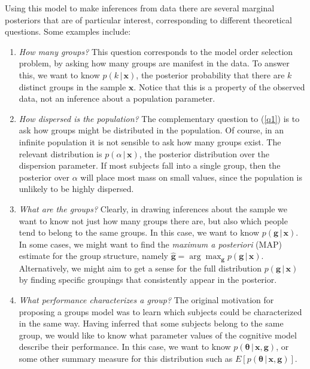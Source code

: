 \documentclass[authoryear]{elsarticle}
\newcommand{\condon}{\,|\,}
\newcommand{\vctr}[1]{\bm{#1}}
\begin{document}
Using this model to make inferences from data there are several
marginal posteriors that are of particular interest, corresponding to different
theoretical questions. Some examples include:
\begin{enumerate}
\item \label{q1} {\it How many groups?} This question corresponds to the model order
selection problem, by asking how many groups are manifest in the data. To answer this,
we want to know $p(k\condon \vctr{x})$, the
posterior probability that there are $k$ distinct groups in the
sample $\vctr{x}$. Notice that this is a property of the observed data, not an
inference about a population parameter. \vspace*{5pt}
\item {\it How dispersed is the population?} The complementary question to
(\ref{q1}) is to ask how groups might be distributed in the
population. Of course, in an infinite population it is not sensible to ask
how many groups exist.  The relevant distribution is $p(\alpha \condon \vctr{x})$,
the posterior distribution over the dispersion parameter. If most subjects
fall into a single group, then the posterior over $\alpha$ will place most mass
on small values, since the population is unlikely to be highly dispersed. \vspace*{5pt}
\item {\it What are the groups?} Clearly, in drawing inferences about the
sample we want to know not just how many groups there are, but also which people tend
to belong to the same groups. In this case, we want to know $p(\vctr{g} \condon \vctr{x})$.
In some cases, we might want to find the {\it maximum a posteriori} (MAP)
estimate for the group structure, namely $\hat{\vctr{g}} = \arg \max_{\vctr{g}}
p(\vctr{g} \condon \vctr{x})$. Alternatively, we might aim to get a sense for the
full distribution $p(\vctr{g} \condon \vctr{x})$ by finding specific groupings that
consistently appear in the posterior. \vspace*{5pt}
\item {\it What performance characterizes a group?} The original motivation for
proposing a groups model was to learn which subjects could be characterized
in the same way. Having inferred that some subjects belong to
the same group, we would like to know what parameter values of the cognitive model describe their
performance. In this case, we want to know $p(\vctr{\theta} \condon \vctr{x}, \vctr{g})$,
or some other summary measure for
this distribution such as $E[p(\vctr{\theta} \condon \vctr{x}, \vctr{g})]$.
\end{enumerate}
\end{document}

